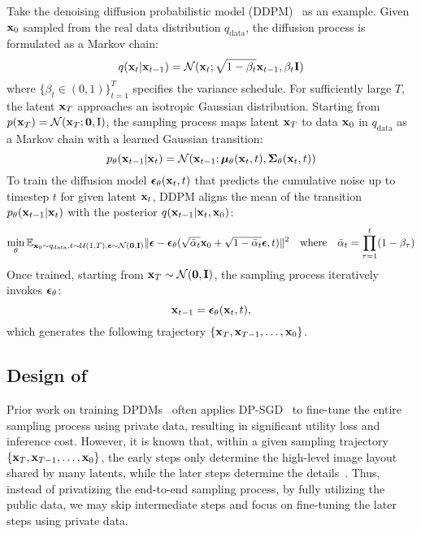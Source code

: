 Take the denoising diffusion probabilistic model (DDPM)~\citep{ho2020denoising} as an example. Given ${\mathbf{x}}_0$ sampled from the real data distribution $q_\mathrm{data}$, the diffusion process is formulated as a Markov chain: 
\begin{equation}
\label{eq:sampling}
q({\mathbf{x}}_t | {\mathbf{x}}_{t-1}) = {\mathcal{N}}({\mathbf{x}}_t ; \sqrt{1 - \beta_t}{\mathbf{x}}_{t-1}, \beta_t \mathbf{I}) 
\end{equation}
where $\{\beta_t\in (0,1)\}_{t=1}^T$ specifies the variance schedule. For sufficiently large $T$, the latent ${\mathbf{x}}_T$ approaches an isotropic Gaussian distribution. Starting from $p({\mathbf{x}}_T) = {\mathcal{N}}({\mathbf{x}}_T; \bm{0}, \bm{\text{I}})$, the sampling process maps latent ${\mathbf{x}}_T$ to data ${\mathbf{x}}_0$ in $q_\mathrm{data}$ as a Markov chain with a learned Gaussian transition:
\begin{equation}
p_\theta({\mathbf{x}}_{t-1} | {\mathbf{x}}_t) = {\mathcal{N}}( {\mathbf{x}}_{t-1}; \bm{\mu}_\theta({\mathbf{x}}_t, t), \bm{\Sigma}_\theta({\mathbf{x}}_t, t)) 
\end{equation}
To train the diffusion model $\bm{\epsilon}_\theta({\mathbf{x}}_t, t)$ that predicts the cumulative noise up to timestep $t$ for given latent ${\mathbf{x}}_t$, DDPM aligns the mean of the transition $p_\theta({\mathbf{x}}_{t-1} | {\mathbf{x}}_t)$ with the posterior $q({\mathbf{x}}_{t-1}| {\mathbf{x}}_t, {\mathbf{x}}_0)$: 
\begin{equation}
\label{eq:mean-align}
\min_\theta \mathbb{E}_{{\mathbf{x}}_0 \sim q_\mathrm{data}, t \sim {\mathcal{U}}(1, T), \bm{\epsilon} \sim {\mathcal{N}}(\mathbf{0},  \mathbf{I})} \| \bm{\epsilon} - \bm{\epsilon}_\theta(\sqrt{\bar{\alpha}_t} {\mathbf{x}}_0 + \sqrt{1-\bar{\alpha}_t}\bm{\epsilon}, t)  \|^2  \nonumber  \quad \text{where} \quad  \bar{\alpha}_t = \prod_{\tau=1}^t (1  - \beta_\tau)
\end{equation}
Once trained, starting from ${\mathbf{x}}_T \sim {\mathcal{N}}(\mathbf{0}, \mathbf{I})$, the sampling process iteratively invokes $\bm{\epsilon}_\theta$:
\begin{equation}
\label{eq:sample}
{\mathbf{x}}_{t-1} = \bm{\epsilon}_\theta({\mathbf{x}}_t, t),
\end{equation}
which generates the following trajectory $\{{\mathbf{x}}_T, {\mathbf{x}}_{T-1}, \ldots, {\mathbf{x}}_0\}$.

\subsection{Design of \system}

Prior work on training DPDMs~\citep{dockhorn2022differentially,ghalebikesabi2023differentially,lyu2023differentially} often applies DP-SGD~\citep{abadi2016deep} to fine-tune the entire sampling process using private data, resulting in significant utility loss and inference cost. However, it is known that, within a given sampling trajectory $\{{\mathbf{x}}_T, {\mathbf{x}}_{T-1}, \ldots, {\mathbf{x}}_0\}$, the early steps only determine the high-level image layout shared by many latents, while the later steps determine the details~\citep{sensitivity,sdedit}. Thus, instead of privatizing the end-to-end sampling process, by fully utilizing the public data, we may skip intermediate steps and focus on fine-tuning the later steps using private data.



